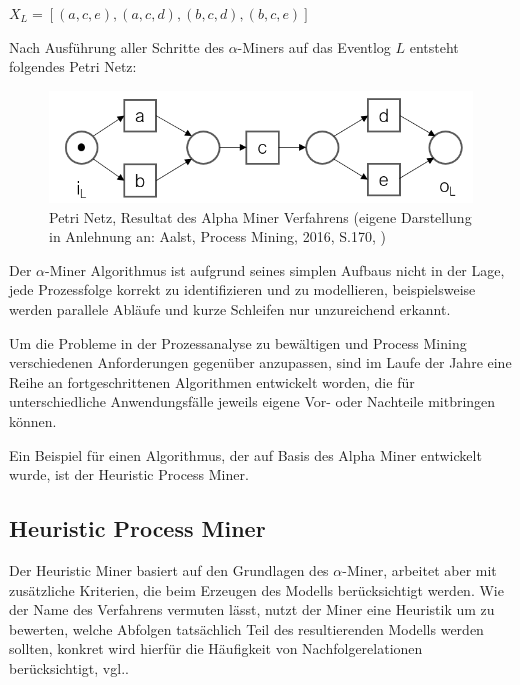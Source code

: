 $ X_L={ [({a}, {c, e}), ({a}, {c, d}),
({b, c}, {d}), ({b, c}, {e}) ]}$

Nach Ausführung aller Schritte des $\alpha$-Miners auf das Eventlog $L$ entsteht folgendes Petri Netz:

\begin{figure}[!h]
    \centering
    \includegraphics[scale=0.6]{figures/Appbildungen/alpha_petri_net.png}
    \caption{Petri Netz, Resultat des Alpha Miner Verfahrens (eigene Darstellung in Anlehnung an: Aalst, Process Mining, 2016, S.170, \cite{PMManifesto})}
    \label{fig:petriNetExample}
\end{figure}

Der $\alpha$-Miner Algorithmus ist aufgrund seines simplen Aufbaus nicht in der Lage, jede Prozessfolge korrekt zu identifizieren und zu modellieren, beispielsweise werden parallele Abläufe und kurze Schleifen nur unzureichend erkannt.

Um die Probleme in der Prozessanalyse zu bewältigen und Process Mining verschiedenen Anforderungen gegenüber anzupassen, sind im Laufe der Jahre eine Reihe an fortgeschrittenen Algorithmen entwickelt worden, die für unterschiedliche Anwendungsfälle jeweils eigene Vor- oder Nachteile mitbringen können. 

Ein Beispiel für einen Algorithmus, der auf Basis des Alpha Miner entwickelt wurde, ist der Heuristic Process Miner.

\subsection{Heuristic Process Miner}
Der Heuristic Miner basiert auf den Grundlagen des $\alpha$-Miner, arbeitet aber mit zusätzliche Kriterien, die beim Erzeugen des Modells berücksichtigt werden. Wie der Name des Verfahrens vermuten lässt, nutzt der Miner eine Heuristik um zu bewerten, welche Abfolgen tatsächlich Teil des resultierenden Modells werden sollten, konkret wird hierfür die Häufigkeit von Nachfolgerelationen berücksichtigt, vgl.\cite{heurMining}.

